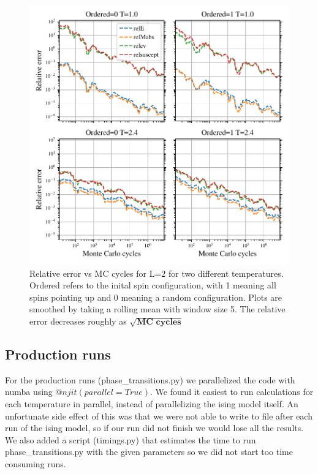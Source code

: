 \begin{figure}[H]
  \centering
  \includegraphics[width=\textwidth]{../figures/relative_error.pdf}
  \caption{Relative error vs MC cycles for L=2 for two different temperatures. Ordered
  refers to the inital spin configuration, with 1 meaning all spins pointing up and
  0 meaning a random configuration. Plots are smoothed by taking a
  rolling mean with window size 5. The relative error decreases roughly as
  $\sqrt{\textbf{MC cycles}}$}
  \label{fig:error_L2}
\end{figure}


\subsection{Production runs}

For the production runs (phase\_transitions.py) we parallelized the code with
numba using $@njit(parallel=True)$. We found it easiest to run calculations for
each temperature in parallel, instead of parallelizing the ising model itself.
An unfortunate side effect of this was that we were not able to write to file
after each run of the ising model, so if our run did not finish we would lose
all the results. We also added a script (timings.py) that estimates the time to
run phase\_transitions.py with the given parameters so we did not start too time
consuming runs.

